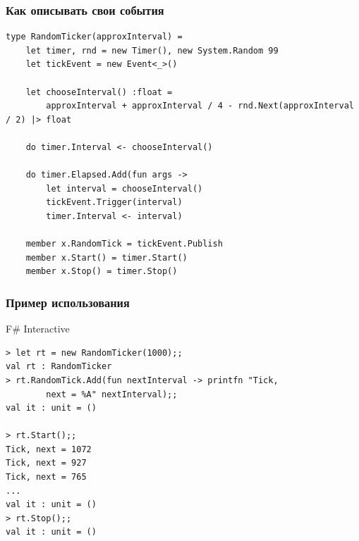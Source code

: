 \documentclass[xetex,mathserif,serif]{beamer}
\begin{document}
    \begin{frame}[fragile]
        \frametitle{Как описывать свои события}
        \begin{footnotesize}
            \begin{verbatim}
type RandomTicker(approxInterval) =
    let timer, rnd = new Timer(), new System.Random 99
    let tickEvent = new Event<_>()

    let chooseInterval() :float =
        approxInterval + approxInterval / 4 - rnd.Next(approxInterval / 2) |> float

    do timer.Interval <- chooseInterval()

    do timer.Elapsed.Add(fun args ->
        let interval = chooseInterval()
        tickEvent.Trigger(interval)
        timer.Interval <- interval)

    member x.RandomTick = tickEvent.Publish
    member x.Start() = timer.Start()
    member x.Stop() = timer.Stop()
            \end{verbatim}
        \end{footnotesize}
    \end{frame}

    \begin{frame}[fragile]
        \frametitle{Пример использования}
        \begin{alertblock}{F\# Interactive}
            \begin{verbatim}
> let rt = new RandomTicker(1000);;
val rt : RandomTicker
> rt.RandomTick.Add(fun nextInterval -> printfn "Tick, 
        next = %A" nextInterval);;
val it : unit = ()

> rt.Start();;
Tick, next = 1072
Tick, next = 927
Tick, next = 765
...
val it : unit = ()
> rt.Stop();;
val it : unit = ()
            \end{verbatim}
        \end{alertblock}
    \end{frame}
\end{document}
